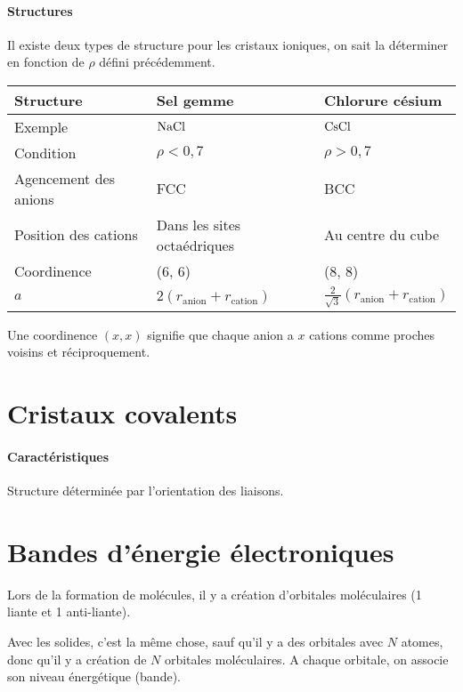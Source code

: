 \paragraph{Structures}
Il existe deux types de structure pour les cristaux ioniques, on sait la déterminer en fonction de $\rho$ défini précédemment.

\begin{center}
	\begin{tabular}{|l|l|l|}
		\hline
		Structure & Sel gemme & Chlorure césium\\
		\hline
		Exemple & $\ce{NaCl}$ & $\ce{CsCl}$\\
		\hline
		Condition & $\rho < 0,7$ & $\rho > 0,7$\\
		\hline
		Agencement des anions & FCC & BCC\\
		\hline
		Position des cations & Dans les sites octaédriques & Au centre du cube\\
		\hline
		Coordinence & (6, 6) & (8, 8)\\
		\hline
		$a$ & $2 (r_\mathrm{anion} + r_\mathrm{cation})$ & $\frac{2}{\sqrt{3}} (r_\mathrm{anion} + r_\mathrm{cation})$\\
		\hline
	\end{tabular}
\end{center}
Une coordinence $(x, x)$ signifie que chaque anion a $x$ cations comme proches voisins et réciproquement.

\section{Cristaux covalents}

\paragraph{Caractéristiques}
Structure déterminée par l'orientation des liaisons.

\section{Bandes d'énergie électroniques}

Lors de la formation de molécules, il y a création d'orbitales moléculaires (1 liante et 1 anti-liante).

Avec les solides, c'est la même chose, sauf qu'il y a des orbitales avec $N$ atomes, donc qu'il y a création de $N$ orbitales moléculaires.
A chaque orbitale, on associe son niveau énergétique (bande).

